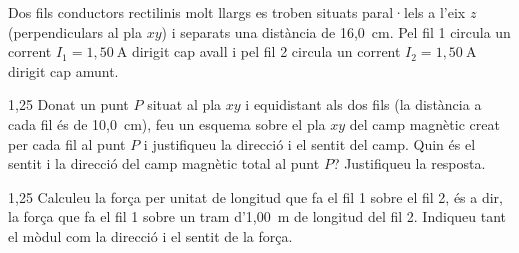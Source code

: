 Dos fils conductors rectilinis molt llargs es troben situats paral·lels a l'eix $z$ (perpendiculars al pla $xy$) i separats una distància de 16,0~cm. Pel fil 1 circula un corrent $I_1 = 1,50\ \mathrm{A}$ dirigit cap avall i pel fil 2 circula un corrent $I_2 = 1,50\ \mathrm{A}$ dirigit cap amunt.


\begin{apartat}{1,25}
Donat un punt $P$ situat al pla $xy$ i equidistant als dos fils (la distància a cada fil és de 10,0~cm), feu un esquema sobre el pla $xy$ del camp magnètic creat per cada fil al punt $P$ i justifiqueu la direcció i el sentit del camp. Quin és el sentit i la direcció del camp magnètic total al punt $P$? Justifiqueu la resposta.
\end{apartat}

\begin{apartat}{1,25}
Calculeu la força per unitat de longitud que fa el fil 1 sobre el fil 2, és a dir, la força que fa el fil 1 sobre un tram d'1,00~m de longitud del fil 2. Indiqueu tant el mòdul com la direcció i el sentit de la força.
\end{apartat}

